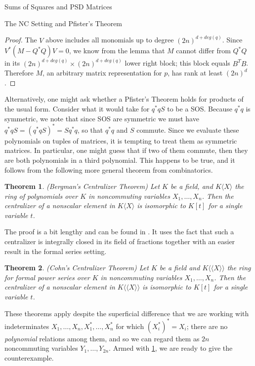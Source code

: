 \documentclass[12pt,oneside,final]{ucthesisucsbmath2010}
\newtheorem{thm}{Theorem}[section]
\theoremstyle{definition}
\begin{document}
\begin{chapter}{Sums of Squares and PSD Matrices}
\begin{section}{The NC Setting and Pfister's Theorem}
\begin{proof}
The $V$ above includes all monomials up to degree $(2n)^{d+deg(q)}$.  Since $V^*(M-Q^*Q)V=0$, we know from the lemma that $M$ cannot differ from $Q^*Q$ in its $(2n)^{d+deg(q)}\times (2n)^{d+deg(q)}$ lower right block; this block equals $B^TB$.  Therefore $M$, an arbitrary matrix representation for $p$, has rank at least $(2n)^d$.\end{proof}

Alternatively, one might ask whether a Pfister's Theorem holds for products of the usual form. Consider what it would take for $q^*qS$ to be a SOS.  Because $q^*q$ is symmetric, we note that since SOS are symmetric we must have $q^*qS=(q^*qS)^*=Sq^*q$, so that $q^*q$ and $S$ commute.  Since we evaluate these polynomials on tuples of matrices, it is tempting to treat them as symmetric matrices.  In particular, one might guess that if two of them commute, then they are both polynomials in a third polynomial. This happens to be true, and it follows from the following more general theorem from combinatorics.

\begin{thm}
(Bergman's Centralizer Theorem) Let $K$ be a field, and $K\langle X\rangle$ the ring of polynomials over $K$ in noncommuting variables $X_1,\ldots,X_n$.  Then the centralizer of a nonscalar element in $K\langle X\rangle$ is isomorphic to $K[t]$ for a single variable $t$.
\label{Bergman}
\end{thm}
The proof is a bit lengthy and can be found in \cite{LO}.  It uses the fact that such a centralizer is integrally closed in its field of fractions together with an easier result in the formal series setting.

\begin{thm}(Cohn's Centralizer Theorem) Let $K$ be a field and $K\langle \langle X \rangle \rangle$ the ring for formal power series over $K$ in noncommuting variables $X_1, \ldots,X_n$. Then the centralizer of a nonscalar element in $K\langle \langle X \rangle \rangle$ is isomorphic to $K[t]$ for a single variable $t$.

\end{thm}

These theorems apply despite the superficial difference that we are working with indeterminates $X_1,\ldots,X_n,X_1^*, \ldots,X_n^*$ for which $(X_i^*)^*=X_i$; there are no \emph{polynomial} relations among them, and so we can regard them as $2n$ noncommuting variables $Y_1, \ldots,Y_{2n}$. Armed with \ref{Bergman}, we are ready to give the counterexample. 


\end{section}
\end{chapter}
\end{document}
